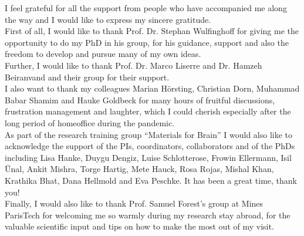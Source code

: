 I feel grateful for all the support from people who have accompanied me along the way and I would like to express my sincere gratitude.\\

First of all, I would like to thank Prof. Dr. Stephan Wulfinghoff for giving me the opportunity to do my PhD in his group, for his guidance, support and also the freedom to develop and pursue many of my own ideas. \\

Further, I would like to thank Prof. Dr. Marco Liserre and Dr. Hamzeh Beiranvand and their group for their support.\\

I also want to thank my colleagues Marian Hörsting, Christian Dorn, Muhammad Babar Shamim and Hauke Goldbeck for many hours of fruitful discussions, frustration management and laughter, which I could cherish especially after the long period of homeoffice during the pandemic.\\

As part of the research training group ``Materials for Brain'' I would also like to acknowledge the support of the PIs, coordinators, collaborators and of the PhDs including Lisa Hanke, Duygu Dengiz, Luise Schlotterose, Frowin Ellermann, Isil Ünal, Ankit Mishra, Torge Hartig, Mete Hauck, Rosa Rojas, Mishal Khan, Krathika Bhat, Dana Hellmold and Eva Peschke. It has been a great time, thank you!\\

Finally, I would also like to thank Prof. Samuel Forest's group at Mines ParisTech for welcoming me so warmly during my research stay abroad, for the valuable scientific input and tips on how to make the most out of my visit.\\

